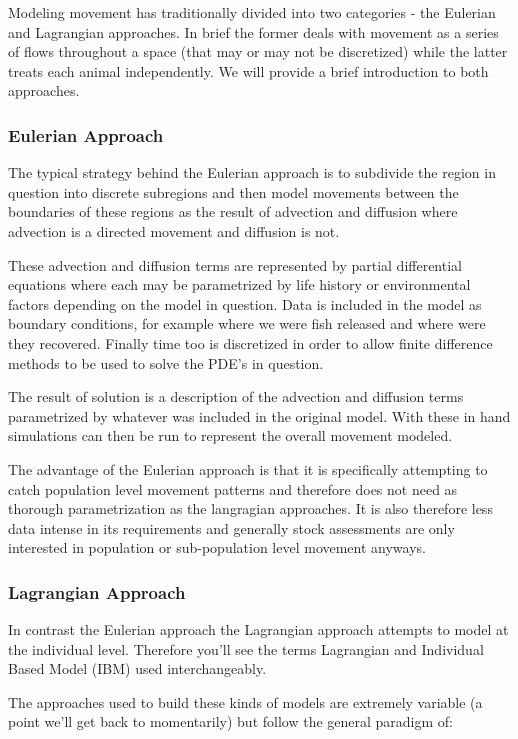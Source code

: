 \documentclass[11pt]{article}
\begin{document}
Modeling movement has traditionally divided into two categories - the Eulerian and Lagrangian approaches. In brief the former deals with movement as a series of flows throughout a space (that may or may not be discretized) while the latter treats each animal independently. We will provide a brief introduction to both approaches.

\subsubsection{Eulerian Approach}

The typical strategy behind the Eulerian approach is to subdivide the region in question into discrete subregions and then model movements between the boundaries of these regions as the result of advection and diffusion where advection is a directed movement and diffusion is not. 

These advection and diffusion terms are represented by partial differential equations where each may be parametrized by life history or environmental factors depending on the model in question. Data is included in the model as boundary conditions, for example where we were fish released and where were they recovered. Finally time too is discretized in order to allow finite difference methods to be used to solve the PDE's in question. 

The result of solution is a description of the advection and diffusion terms parametrized by whatever was included in the original model. With these in hand simulations can then be run to represent the overall movement modeled.

The advantage of the Eulerian approach is that it is specifically attempting to catch population level movement patterns and therefore does not need as thorough parametrization as the langragian approaches. It is also therefore less data intense in its requirements and generally stock assessments are only interested in population or sub-population level movement anyways. 


\subsubsection{Lagrangian Approach}

In contrast the Eulerian approach the Lagrangian approach attempts to model at the individual level. Therefore you'll see the terms Lagrangian and Individual Based Model (IBM) used interchangeably. 

The approaches used to build these kinds of models are extremely variable (a point we'll get back to momentarily) but follow the general paradigm of:
\end{document}
